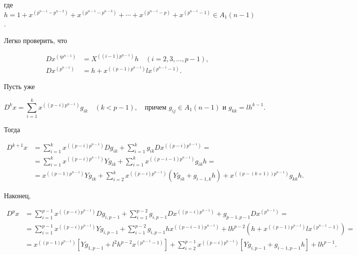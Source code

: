 где $h=1+x^{(p^{n-1}-p^{n-2})}+x^{(p^{n-1}-p^{n-3})}+\dotsb+


x^{(p^{n-1}-p)}+x^{(p^{n-1}-1)}\in A_1(n-1)$.


Легко проверить, что


\begin{align*}


Dx^{(ip^{n-1})}&= X^{((i-1)p^{n-1})}h \quad (i=2,3,\dotsc,p-1),\\


Dx^{(p^{n-1})}&= h+x^{((p-1)p^{n-1})}lx^{(p^{n-1}-1)}.


\end{align*}


Пусть уже


$$


D^kx=\sum^k_{i=1}x^{((p-i)p^{n-1})}g_{ik}\quad (k<p-1),\quad


\text{причем }g_{ij}\in A_1(n-1) \text{ и } g_{kk}=lh^{k-1}.


$$


Тогда


\begin{align*}


D^{k+1}x&=\sum^k_{i=1}x^{((p-i)p^{n-1})}Dg_{ik}+


\sum^k_{i=1}g_{ik}Dx^{((p-i)p^{n-1})}=\\


&=\sum^k_{i=1}x^{((p-i)p^{n-1})}Yg_{ik}+


\sum^k_{i=1}x^{((p-i-1)p^{n-1})}g_{ik}h=\\


&= x^{((p-1)p^{n-1})}Yg_{ik}+\sum^k_{i=2}


x^{((p-i)p^{n-1})}(Yg_{ik}+g_{i-1,k}h)+


x^{((p-(k+1))p^{n-1})}g_{kk}h.


\end{align*}


Наконец,


\begin{align*}


D^px&=\sum^{p-1}_{i=1}x^{((p-i)p^{n-1})}Dg_{i,p-1}+


\sum^{p-2}_{i=1}g_{i,p-1}Dx^{((p-i)p^{n-1})}+


g_{p-1,p-1}Dx^{(p^{n-1})}=\\


%


&=\sum^{p-1}_{i=1}x^{((p-i)p^{n-1})}Yg_{i,p-1}+


\sum^{p-2}_{i-1}g_{i,p-1}hx^{((p-i-1)p^{n-1})}+


lh^{p-2}(h+x^{((p-1)p^{n-1})}lx^{(p^{n-1}-1)})=\\


%


&= x^{((p-1)p^{n-1})}[Yg_{1,p-1}+l^2h^{p-2}


x^{(p^{n-1}-1)}]+\sum^{p-1}_{i=2}x^{((p-i)p^{n-1})}


[Yg_{i,p-1}+g_{i-1,p-1}h]+lh^{p-1}.


\end{align*}


